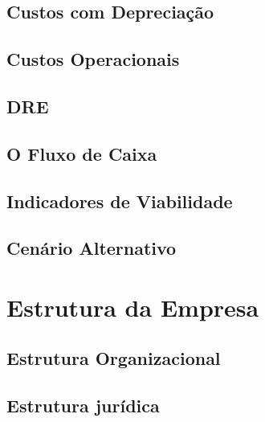 \documentclass[a4paper, 12pt]{paper}
\begin{document}
\subsection{Custos com Depreciação}
\subsection{Custos Operacionais}
\subsection{DRE}
\subsection{O Fluxo de Caixa}
\subsection{Indicadores de Viabilidade}
\subsection{Cenário Alternativo}
\section{Estrutura da Empresa}
\subsection{Estrutura Organizacional}
\subsection{Estrutura jurídica}
\end{document}
